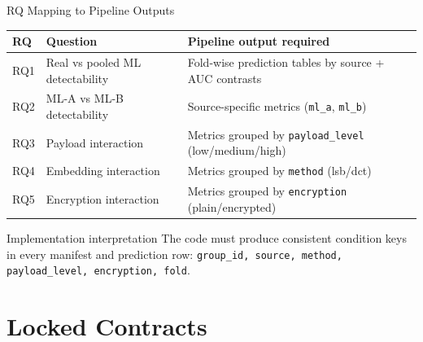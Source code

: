 \documentclass[aspectratio=169,11pt]{beamer}
\begin{document}
\begin{frame}{RQ Mapping to Pipeline Outputs}
\scriptsize
\renewcommand{\arraystretch}{1.18}
\begin{tabular}{@{}p{1.0cm}p{5.0cm}p{6.9cm}@{}}
\toprule
\textbf{RQ} & \textbf{Question} & \textbf{Pipeline output required} \\
\midrule
RQ1 & Real vs pooled ML detectability & Fold-wise prediction tables by source + AUC contrasts \\
RQ2 & ML-A vs ML-B detectability & Source-specific metrics (\texttt{ml\_a}, \texttt{ml\_b}) \\
RQ3 & Payload interaction & Metrics grouped by \texttt{payload\_level} (low/medium/high) \\
RQ4 & Embedding interaction & Metrics grouped by \texttt{method} (lsb/dct) \\
RQ5 & Encryption interaction & Metrics grouped by \texttt{encryption} (plain/encrypted) \\
\bottomrule
\end{tabular}
\vspace{0.15cm}
\begin{block}{Implementation interpretation}
The code must produce consistent condition keys in every manifest and prediction row: 
\texttt{group\_id, source, method, payload\_level, encryption, fold}.
\end{block}
\end{frame}

\section{Locked Contracts}
\end{document}

